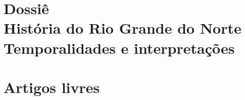 \usepackage{mfirstuc} %
\usepackage{tikz} %
\usepackage{lastpage} %
\usepackage{paralist} %
\usepackage[labelsep=endash, font={footnotesize,sf}]{caption} %
\usepackage[scale=2]{ccicons} %
\usepackage{titlesec} %
\usepackage{contour}
\usepackage{ulem}

\renewcommand{\ULdepth}{1.8pt}
\contourlength{0.8pt}

\newcommand{\myuline}[1]{%
  \uline{\phantom{#1}}%
  \llap{\contour{white}{#1}}%
}

\usetikzlibrary{svg.path}







\makecover

\frontmatter

\maketitlepage

\makecopyright

\tableofcontents{}




\mainmatter

\part[Dossiê: História do Rio Grande do Norte: \itshape{temporalidades e interpretações}]{{\normalsize Dossiê}\\
História do Rio Grande do Norte\\
\textup{Temporalidades e interpretações}
}














\part{Artigos livres}




